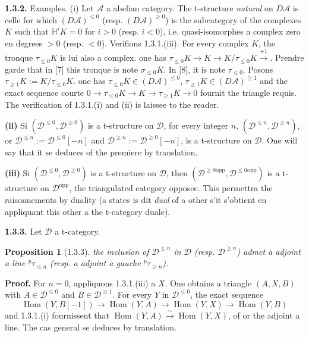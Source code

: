 \documentclass[12pt,a4paper]{article}
\theoremstyle{plain}
\newtheorem{proposition}[theorem]{Proposition}
\theoremstyle{definition}
\theoremstyle{remark}
\DeclareMathOperator{\Hom}{Hom}
\newcommand{\HH}{\mathbb{H}}
\newcommand{\cA}{\mathcal{A}}
\newcommand{\cD}{\mathcal{D}}
\begin{document}
\noindent
\textbf{1.3.2.} Examples. (i) Let $\cA$ a abelian category. The t-structure \emph{natural} on $D\cA$ is celle for which $(D\cA)^{\leq 0}$ (resp. $(D\cA)^{\geq 0}$) is the subcategory of the complexes $K$ such that $\HH^{i}K = 0$ for $i > 0$ (resp. $i < 0$), i.e. quasi-isomorphes a complex zero en degrees $> 0$ (resp. $< 0$). Verifions 1.3.1.(iii). For every complex $K$, the tronque $\tau_{\leq 0}K$ is lui also a complex. one has $\tau_{\leq 0}K \to K \to K/\tau_{\leq 0}K \xrightarrow{+1}$. Prendre garde that in [7] this tronque is note $\sigma_{\leq 0}K$. In [8], it is note $\tau_{\leq 0}$. Posons $\tau_{\geq 1}K := K/\tau_{\leq 0}K$. one has $\tau_{\leq 0}K \in (D\cA)^{\leq 0}$, $\tau_{\geq 1}K \in (D\cA)^{\geq 1}$ and the exact sequence courte $0 \to \tau_{\leq 0}K \to K \to \tau_{\geq 1}K \to 0$ fournit the triangle requis. The verification of 1.3.1.(i) and (ii) is laissee to the reader.

\smallskip

\noindent
\textbf{(ii)} Si $(\cD^{\leq 0}, \cD^{\geq 0})$ is a t-structure on $\cD$, for every integer $n$, $(\cD^{\leq n}, \cD^{\geq n})$, or $\cD^{\leq n} := \cD^{\leq 0}[-n]$ and $\cD^{\geq n} := \cD^{\geq 0}[-n]$, is a t-structure on $\cD$. One will say that it se deduces of the premiere by translation.

\smallskip

\noindent
\textbf{(iii)} Si $(\cD^{\leq 0}, \cD^{\geq 0})$ is a t-structure on $\cD$, then $(\cD^{\geq 0\mathrm{opp}}, \cD^{\leq 0\mathrm{opp}})$ is a t-structure on $\cD^{\mathrm{opp}}$, the triangulated category opposee. This permettra the raisonnements by duality (a states is dit \emph{dual} of a other s'it s'obtient en appliquant this other a the t-category duale).

\smallskip

\noindent
\textbf{1.3.3.} Let $\cD$ a t-category.

\begin{proposition}[1.3.3]
the inclusion of $\cD^{\leq n}$ in $\cD$ (resp. $\cD^{\geq n}$) admet a adjoint a line ${}^{p}\tau_{\leq n}$ (resp. a adjoint a gauche ${}^{p}\tau_{\geq n}$).
\end{proposition}

\smallskip

\noindent
\textbf{Proof.} For $n = 0$, appliquons 1.3.1.(iii) a $X$. One obtains a triangle $(A, X, B)$ with $A \in \cD^{\leq 0}$ and $B \in \cD^{\geq 1}$. For every $Y$ in $\cD^{\leq 0}$, the exact sequence
\[
\Hom(Y, B[-1]) \to \Hom(Y, A) \to \Hom(Y, X) \to \Hom(Y, B)
\]
and 1.3.1.(i) fournissent that $\Hom(Y, A) \xrightarrow{\sim} \Hom(Y, X)$, of or the adjoint a line. The cas general se deduces by translation.
\end{document}
